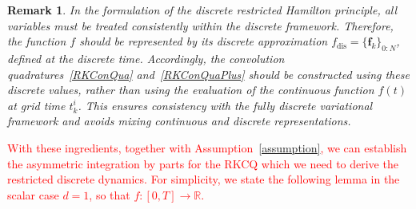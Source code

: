 \documentclass[a4paper,10pt,reqno]{amsart}
\newtheorem{remark}{Remark}[section]
\theoremstyle{definition}
\newcommand{\R}{\mathbb{R}}      %
\DeclareMathOperator{\diag}{diag}
\newcommand{\dis}{\text{dis}}
\begin{document}
\begin{remark}
In the formulation of the discrete restricted Hamilton principle, all variables must be treated consistently within the discrete framework. Therefore, the function 
$f$ should be represented by its discrete approximation 
$f_\dis=\{\mathbf f_k\}_{0:N}$, defined at the discrete time. Accordingly, the convolution quadratures~\eqref{RKConQua} and~\eqref{RKConQuaPlus}  should be constructed using these discrete values, rather than using the evaluation of the continuous function $f(t)$ at grid time $t_k^i$. This ensures consistency with the fully discrete variational framework and avoids mixing continuous and discrete representations.
\end{remark}
\textcolor{red}{With these ingredients, together with Assumption~\eqref{assumption}, we can establish the asymmetric integration by parts for the RKCQ which we need to derive the restricted discrete dynamics.}
\textcolor{red}{For simplicity, we state the following lemma in the scalar case 
$d=1$, so that  $f:[0,T]\to \R$.}


\end{document}
